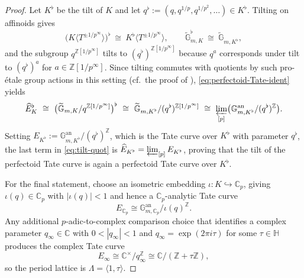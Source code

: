 \documentclass[11pt]{article}
\theoremstyle{remark}
\newcommand{\G}{\mathbb{G}}
\newcommand{\Z}{\mathbb{Z}}
\newcommand{\an}{\mathrm{an}}
\begin{document}
\begin{proof}
Let $K^\flat$ be the tilt of $K$ and let $q^\flat:=(q,q^{1/p},q^{1/p^2},\dots)\in K^\flat$.
Tilting on affinoids gives
\begin{equation}\label{eq:tilt-affinoid}
\bigl(K\langle T^{\pm 1/p^\infty}\rangle\bigr)^\flat\ \cong\ K^\flat\langle T^{\pm 1/p^\infty}\rangle,
\qquad
\widetilde{\G}_{m,K}^\flat\ \cong\ \widetilde{\G}_{m,K^\flat},
\end{equation}
and the subgroup $q^{\Z[1/p^\infty]}$ tilts to $(q^\flat)^{\Z[1/p^\infty]}$ because $q^a$ corresponds under tilt to $(q^\flat)^a$ for
$a\in\Z[1/p^\infty]$. Since tilting commutes with quotients by such pro-\'etale group actions in this setting (cf.\ the proof of
\cite[Thm.~2.9]{ScholzeWeinstein2017}), \eqref{eq:perfectoid-Tate-ident} yields
\begin{equation}\label{eq:tilt-quot}
\widehat{E}_K^\flat
\ \cong\ 
\bigl(\widetilde{\G}_{m,K}/q^{\Z[1/p^\infty]}\bigr)^\flat
\ \cong\
\widetilde{\G}_{m,K^\flat}/(q^\flat)^{\Z[1/p^\infty]}
\ \cong\
\varprojlim_{[p]} \bigl(\G_{m,K^\flat}^{\an}/(q^\flat)^{\Z}\bigr).
\end{equation}
Setting $E_{K^\flat}:=\G_{m,K^\flat}^{\an}/(q^\flat)^{\Z}$, which is the Tate curve over $K^\flat$ with parameter $q^\flat$, the last term
in \eqref{eq:tilt-quot} is $\widehat{E}_{K^\flat}=\varprojlim_{[p]}E_{K^\flat}$, proving that the tilt of the perfectoid Tate curve is again
a perfectoid Tate curve over $K^\flat$.

For the final statement, choose an isometric embedding
$\iota  : K \hookrightarrow \mathbb{C}_{p}$, giving $\iota(q) \in \mathbb{C}_{p}$
with $|\iota(q)| < 1$ and hence a $\mathbb{C}_{p}$-analytic Tate curve
\begin{equation}
E_{\mathbb{C}_{p}} \cong
\mathbb{G}_{m,\mathbb{C}_{p}}^{\mathrm{an}} / \iota(q)^{\mathbb{Z}}.
\end{equation}
Any additional $p$-adic-to-complex comparison choice that identifies a complex
parameter $q_{\infty} \in \mathbb{C}$ with $0 < |q_{\infty}| < 1$ and
$q_{\infty} = \exp(2\pi i \tau)$ for some $\tau \in \mathbb{H}$ produces the
complex Tate curve
\begin{equation}\label{eq:complex-Tate}
E_{\infty} \cong \mathbb{C}^{\times} / q_{\infty}^{\mathbb{Z}}
\cong \mathbb{C} / (\mathbb{Z} + \tau \mathbb{Z}),
\end{equation}
so the period lattice is $\Lambda = \langle 1, \tau \rangle$.
\end{proof}
\end{document}
